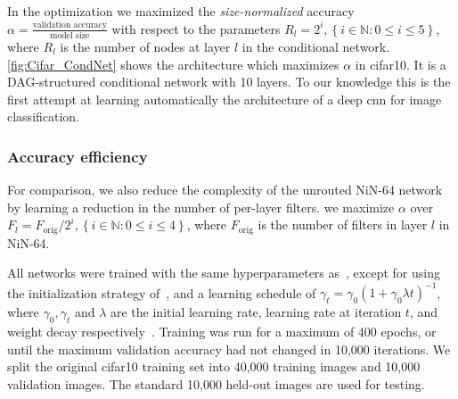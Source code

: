 \documentclass[thesis]{subfiles}
\begin{document}
	In the optimization we maximized the {\em size-normalized} accuracy $\alpha =\frac{\textrm{validation accuracy}}{\textrm{model size}}$ with respect to the parameters $R_l = 2^i, \left\{i\in \mathbb{N} : 0 \le i \le 5\right\}$, where $R_l$ is the number of nodes at layer $l$ in the conditional network. 
	\cref{fig:Cifar_CondNet} shows the architecture which maximizes $\alpha$ in \gls{cifar10}. 
	It is a DAG-structured conditional network with 10 layers.
	To our knowledge this is the first attempt at learning automatically the architecture of a deep \gls{cnn} for image classification.
	
	\subsubsection{Accuracy \vs{}efficiency}
	For comparison, we also reduce the complexity of the unrouted NiN-64 network by learning a reduction in the number of per-layer filters. 
	\ie we maximize $\alpha$ over $F_l = F_\textrm{orig}/2^i, \left\{i\in \mathbb{N} : 0 \le i \le 4\right\}$, where $F_\textrm{orig}$ is the number of filters in layer $l$ in NiN-64. 
	
	All networks were trained with the same hyperparameters as~\citep{Lin2013NiN}, 
	except for using the initialization strategy of~\citep{He2015b}, 
	and a learning schedule of $\gamma_t = \gamma_0(1+\gamma_0\lambda t)^{-1}$, where $\gamma_0,\gamma_t$ and $\lambda$ are the initial learning rate, learning rate at iteration $t$, and weight decay respectively~\citep{Bottou2012sgdtricks}. Training was run for a maximum of 400 epochs, or until the maximum validation accuracy had not changed in 10,000 iterations. 
	We split the original \gls{cifar10} training set into 40,000 training images and 
	10,000 validation images. 
	The standard 10,000 held-out images are used for testing.
	
\end{document}
